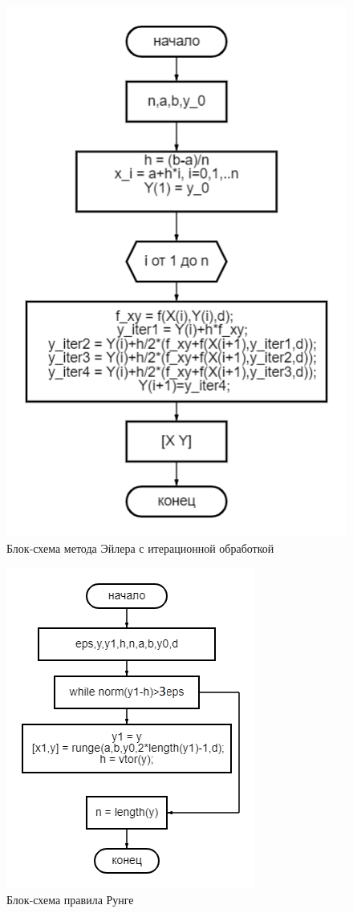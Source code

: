 \documentclass[a4paper]{article}
\begin{document}
\begin{figure}[h!]
\begin{center}
\includegraphics[scale=0.7]{diagram (6).png} 
\end{center}
\caption{Блок-схема метода Эйлера с итерационной обработкой} \label{Рис1}
\end{figure}

\begin{figure}[h!]
\begin{center}
\includegraphics[scale=0.7]{diagram (6)1.png} 
\end{center}
\caption{Блок-схема правила Рунге} \label{Рис2}
\end{figure}
\end{document}
